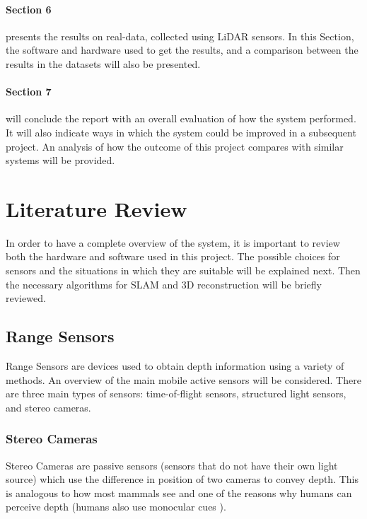 \documentclass[11pt]{article}
\begin{document}
\paragraph{Section 6} presents the results on real-data, collected using LiDAR sensors. In this Section, the software and hardware used to get the results, and a comparison between the results in the datasets will also be presented.
		
\paragraph{Section 7} will conclude the report with an overall evaluation of how the system performed. It will also indicate ways in which the system could be improved in a subsequent project. An analysis of how the outcome of this project compares with similar systems will be provided.

	\newpage
	\section{Literature Review}

In order to have a complete overview of the system, it is important to review both the hardware and software used in this project. The possible choices for sensors and the situations in which they are suitable will be explained next. Then the necessary algorithms for SLAM and 3D reconstruction will be briefly reviewed.

	\subsection{Range Sensors}
	\label{subs:RangeSensors}
	
Range Sensors are devices used to obtain depth information using a variety of methods. An overview of the main mobile active sensors will be considered. There are three main types of sensors: time-of-flight sensors, structured light sensors, and stereo cameras.

	\subsubsection{Stereo Cameras}
	
Stereo Cameras are passive sensors (sensors that do not have their own light source) which use the difference in position of two cameras to convey depth. This is analogous to how most mammals see and one of the reasons why humans can perceive depth (humans also use monocular cues \cite{goldstein2016sensation}).
\end{document}
